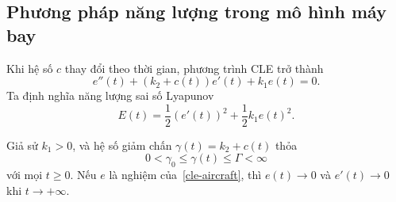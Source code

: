 ﻿\documentclass[12pt]{article}
\begin{document}
\subsection{Phương pháp năng lượng trong mô hình máy bay}

Khi hệ số $c$ thay đổi theo thời gian, phương trình CLE trở thành
\begin{equation}\label{cle-aircraft}
 \boxed{e''(t) + (k_2 + c(t))e'(t) + k_1e(t) = 0. }
\end{equation}
Ta định nghĩa năng lượng sai số Lyapunov 
\[
 E(t) = \frac{1}{2}(e'(t))^2 + \frac{1}{2}k_1e(t)^2.
\]

\begin{theorem}
Giả sử $k_1 > 0$, và hệ số giảm chấn
$\gamma(t) = k_2 + c(t)$ thỏa
\[
 0 < \gamma_0\le \gamma(t)\le \Gamma < \infty
\]
với mọi $t \geq 0$. Nếu $e$ là nghiệm của~\eqref{cle-aircraft}, thì $e(t) \to 0$ và $e'(t) \to 0$ khi $t \to + \infty$.

\end{theorem}
\end{document}
